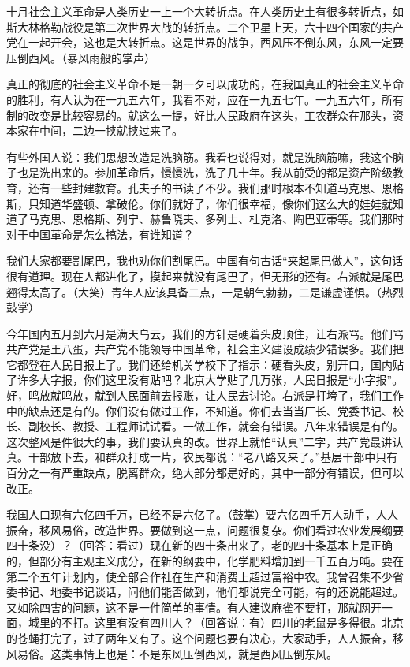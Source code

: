 十月社会主义革命是人类历史一上一个大转折点。在人类历史土有很多转折点，如斯大林格勒战役是第二次世界大战的转折点。二个卫星上天，六十四个国家的共产党在一起开会，这也是大转折点。这是世界的战争，西风压不倒东风，东风一定要压倒西风。（暴风雨般的掌声）

真正的彻底的社会主义革命不是一朝一夕可以成功的，在我国真正的社会主义革命的胜利，有人认为在一九五六年，我看不对，应在一九五七年。一九五六年，所有制的改变是比较容易的。就这么一提，好比人民政府在这头，工农群众在那头，资本家在中间，二边一挟就挟过来了。

有些外国人说：我们思想改造是洗脑筋。我看也说得对，就是洗脑筋嘛，我这个脑子也是洗出来的。参加革命后，慢慢洗，洗了几十年。我从前受的都是资产阶级教育，还有一些封建教育。孔夫子的书读了不少。我们那时根本不知道马克思、恩格斯，只知道华盛顿、拿破伦。你们就好了，你们很幸福，像你们这么大的娃娃就知道了马克思、恩格斯、列宁、赫鲁晓夫、多列士、杜克洛、陶巴亚蒂等。我们那时对于中国革命是怎么搞法，有谁知道？

我们大家都要割尾巴，我也劝你们割尾巴。中国有句古话“夹起尾巴做人”，这句话很有道理。现在人都进化了，摸起来就没有尾巴了，但无形的还有。右派就是尾巴翘得太高了。（大笑）青年人应该具备二点，一是朝气勃勃，二是谦虚谨惧。（热烈鼓掌）

今年国内五月到六月是满天乌云，我们的方针是硬着头皮顶住，让右派骂。他们骂共产党是王八蛋，共产党不能领导中国革命，社会主义建设成绩少错误多。我们把它都登在人民日报上了。我们还给机关学校下了指示：硬看头皮，别开口，国内贴了许多大字报，你们这里没有贴吧？北京大学贴了几万张，人民日报是“小字报”。好，鸣放就鸣放，就到人民面前去报账，让人民去讨论。右派是打垮了，我们工作中的缺点还是有的。你们没有做过工作，不知道。你们去当当厂长、党委书记、校长、副校长、教授、工程师试试看。一做工作，就会有错误。八年来错误是有的。这次整风是件很大的事，我们要认真的改。世界上就怕“认真”二字，共产党最讲认真。干部放下去，和群众打成一片，农民都说：“老八路又来了。”基层干部中只有百分之一有严重缺点，脱离群众，绝大部分都是好的，其中一部分有错误，但可以改正。

我国人口现有六亿四千万，已经不是六亿了。（鼓掌）要六亿四千万人动手，人人振奋，移风易俗，改造世界。要做到这一点，问题很复杂。你们看过农业发展纲要四十条没）？（回答：看过）现在新的四十条出来了，老的四十条基本上是正确的，但部分有主观主义成分，在新的纲要中，化学肥料增加到一千五百万吨。要在第二个五年计划内，使全部合作社在生产和消费上超过富裕中农。我曾召集不少省委书记、地委书记谈话，问他们能否做到，他们都说完全可能，有的还说能超过。又如除四害的问题，这不是一件简单的事情。有人建议麻雀不要打，那就网开一面，城里的不打。这里有没有四川人？（回答说：有）四川的老鼠是多得很。北京的苍蝇打完了，过了两年又有了。这个问题也要有决心，大家动手，人人振奋，移风易俗。这类事情上也是：不是东风压倒西风，就是西风压倒东风。

